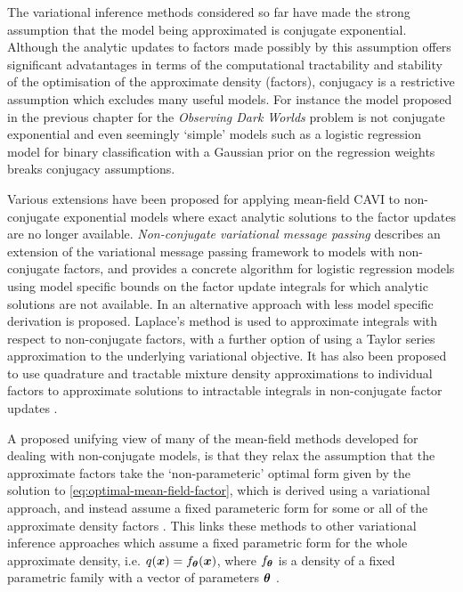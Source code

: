 The variational inference methods considered so far have made the strong assumption that the model being approximated is conjugate exponential. Although the analytic updates to factors made possibly by this assumption offers significant advatantages in terms of the computational tractability and stability of the optimisation of the approximate density (factors), conjugacy is a restrictive assumption which excludes many useful models. For instance the model proposed in the previous chapter for the \emph{Observing Dark Worlds} problem is not conjugate exponential and even seemingly `simple' models such as a logistic regression model for binary classification with a Gaussian prior on the regression weights breaks conjugacy assumptions.

Various extensions have been proposed for applying mean-field \ac{CAVI} to non-conjugate exponential models where exact analytic solutions to the factor updates are no longer available. \emph{Non-conjugate variational message passing} \citep{knowles2011non} describes an extension of the variational message passing framework to models with non-conjugate factors, and provides a concrete algorithm for logistic regression models using model specific bounds on the factor update integrals for which analytic solutions are not available. In \citep{wang2013variational} an alternative approach with less model specific derivation is proposed. Laplace's method is used to approximate integrals with respect to non-conjugate factors, with a further option of using a Taylor series approximation to the underlying variational objective. It has also been proposed to use quadrature and tractable mixture density approximations to individual factors to approximate solutions to intractable integrals in non-conjugate factor updates \citep{wand2011mean}. %

A proposed unifying view of many of the mean-field methods developed for dealing with non-conjugate models, is that they relax the assumption that the approximate factors take the `non-parameteric' optimal form given by the solution to \eqref{eq:optimal-mean-field-factor}, which is derived using a variational approach, and instead assume a fixed parameteric form for some or all of the approximate density factors \citep{rohde2016semiparametric}. This links these methods to other variational inference approaches which assume a fixed parametric form for the whole approximate density, i.e. $q(\boldsymbol{x}) = f_{\boldsymbol{\theta}}(\boldsymbol{x})$, where $f_{\boldsymbol{\theta}}$ is a density of a fixed parametric family with a vector of parameters $\boldsymbol{\theta}$ \citep{graves2011practical,blei2012variational,salimans2013fixed,kingma2013auto,rezende2014stochastic,ranganath2014black,baydin2015automatic}.   

